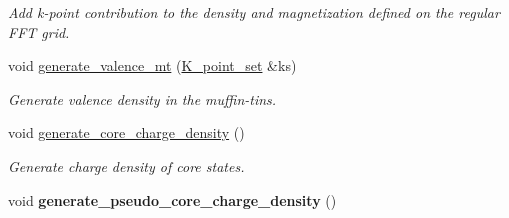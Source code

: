 \begin{DoxyCompactItemize}
\begin{DoxyCompactList}\small\item\em Add k-\/point contribution to the density and magnetization defined on the regular F\+F\+T grid. \end{DoxyCompactList}\item 
void \hyperlink{classsirius_1_1_density_a2310d34270eef4ea835a4e1ac642f1e1}{generate\+\_\+valence\+\_\+mt} (\hyperlink{classsirius_1_1_k__point__set}{K\+\_\+point\+\_\+set} \&ks)
\begin{DoxyCompactList}\small\item\em Generate valence density in the muffin-\/tins. \end{DoxyCompactList}\item 
void \hyperlink{classsirius_1_1_density_a4e9f97560b07fd662011b3f623025b26}{generate\+\_\+core\+\_\+charge\+\_\+density} ()
\begin{DoxyCompactList}\small\item\em Generate charge density of core states. \end{DoxyCompactList}\item 
\hypertarget{classsirius_1_1_density_a8ece62d577aecebbfd881af0ab33e6eb}{}void {\bfseries generate\+\_\+pseudo\+\_\+core\+\_\+charge\+\_\+density} ()\label{classsirius_1_1_density_a8ece62d577aecebbfd881af0ab33e6eb}

\end{DoxyCompactItemize}
